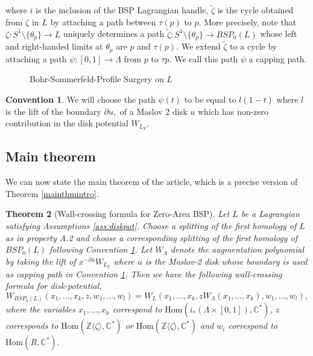 \documentclass[11pt, oneside,dvipsnames]{amsart}
\newcommand{\incfig}[2]{
   
        \def\svgscale{#1}
    {#2.pdf_tex}
      
      
  
 }
\renewcommand{\to}{\rightarrow}
\newcommand{\del}{\partial}
\newcommand{\Hom}{\text{Hom}}
\newcommand{\interval}{[0,1]}
\renewcommand{\to}{\rightarrow}
\newcommand{\<}{\langle}
\renewcommand{\>}{\rangle}
\newcommand{\bC}{\mathbb{C}}
\newcommand{\bZ}{\mathbb{Z}}
\newcommand{\sm}{\ensuremath{\setminus}}
\renewcommand{\to}{\rightarrow}
\newtheorem{Theorem}{Theorem}[section]
\theoremstyle{definition}
\newtheorem{conv}[Theorem]{Convention}
\theoremstyle{definition}
\numberwithin{equation}{subsection}
\begin{document}
where $i$ is the inclusion of the BSP Lagrangian handle, $\widetilde \zeta$ is the cycle obtained from $\zeta$ in $L$ by attaching a path between $\tau (p)$ to $p.$ More precisely, note that $\zeta : S^1\sm \{ \theta_p \} \to L$ uniquely determines a path $\widetilde\zeta : S^1\sm \{ \theta_p \} \to BSP_0(L)$ whose left and right-handed limits at $\theta_p$ are $p$ and $\tau (p).$ We extend $\widetilde\zeta$ to a cycle by attaching a path $\psi: [0,1] \to \Lambda $ from $p$ to $\tau p.$ We call this path $\psi$  a capping path. 



\begin{figure}[ht]
    \makebox[\textwidth][c]{\incfig{1}{homcyc}}
    \caption{Bohr-Sommerfeld-Profile Surgery on $L$}
\end{figure}

\begin{conv}\label{conv:homo}
    We will choose the path $\psi(t)$ to be equal to $l(1-t)$ where $l$ is the lift of the boundary $\partial u,$ of a Maslov 2 disk $u$ which has non-zero contribution in the disk potential $W_{L_Y}$.
\end{conv}
\subsection{Main theorem}
We can now state the main theorem of the article, which is a precise version of Theorem \ref{mainthmintro}. 
\begin{Theorem}[Wall-crossing formula for Zero-Area BSP]\label{mainthm}
    Let $L$ be a Lagrangian satisfying Assumptions \ref{ass:diskpot}. Choose a splitting of the first homology of $L$ as in property A.2 and choose a corresponding splitting of the first homology of $BSP_0(L)$ following Convention \ref{conv:homo}. Let $W_\Lambda$ denote the augmentation polynomial by taking the lift of $x^{-\del u} W_{L_Y}$ where $u$ is the Maslov-2 disk whose boundary is used as capping path in Convention  \ref{conv:homo}. Then we have the following wall-crossing formula for disk-potential,
    \begin{equation}\label{mainform}
        W_{BSP_0(L)}(x_1,\dots,x_k,z,w_1,\dots,w_l)
 =W_L(x_1,\dots,x_k,zW_{\Lambda}(x_1,\dots,x_k),w_1,\dots,w_l),     \end{equation}
 where the variables $x_1,\dots,x_k$ correspond to $\Hom(i_*(\Lambda \times \interval),\bC^*)$, $z$ corresponds to $\Hom(\bZ \langle \zeta \rangle, \bC^*)$ or $\Hom(\bZ \langle \zeta \rangle, \bC^*)$ and $w_i$ correspond to $\Hom(R,\bC^*).$
\end{Theorem}
\end{document}
